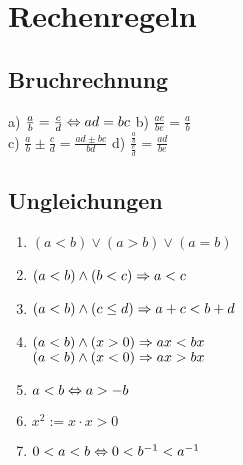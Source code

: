 



\section*{Rechenregeln}
\subsection*{Bruchrechnung}
    a) $\frac{a}{b} = \frac{c}{d} \Leftrightarrow ad = bc$
    b) $\frac{ae}{be} = \frac{a}{b}$\\
    c) $\frac{a}{b} \pm \frac{c}{d} = \frac{ad \pm bc}{bd}$
    d) $\frac{\frac{a}{b}}{\frac{e}{d}} = \frac{ad}{be}$
\subsection*{Ungleichungen}
\begin{enumerate}[label=\alph*., noitemsep]
    \item $(a < b) \lor (a > b) \lor (a = b)$
    \item $(a < b) \land (b < c) \Rightarrow a < c$
    \item $(a < b) \land (c \leq d) \Rightarrow a + c < b + d$
    \item $(a < b) \land (x > 0) \Rightarrow ax < bx$\\
          $(a < b) \land (x < 0) \Rightarrow ax > bx$
    \item $a < b \Leftrightarrow a > - b$
    \item $x^2 := x \cdot x > 0$
    \item $0 < a < b \Leftrightarrow 0 < b^{-1} < a^{-1}$
\end{enumerate}
